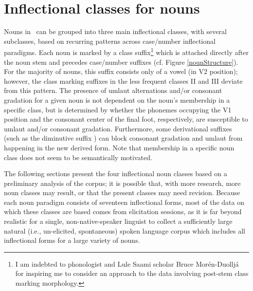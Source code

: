 

\section{Inflectional classes for nouns}\label{nounClasses}
Nouns in \PS\ can be grouped into three main inflectional classes, with several subclasses, based on recurring patterns across case/number inflectional paradigms. Each noun is marked by a class suffix\footnote{I am indebted to phonologist and Lule Saami scholar Bruce Morén-Duolljá for inspiring me to consider an approach to the data involving post-stem class marking morphology.} 
which is attached directly after the noun stem and precedes case/number suffixes (cf. Figure \vref{nounStructure}). For the majority of nouns, this suffix consists only of a vowel (in V2 position); however, the class marking suffixes in the less frequent classes II and III deviate from this pattern. 
The presence of umlaut alternations and/or consonant gradation for a given noun is not dependent on the noun’s membership in a specific class, but is determined by whether the phonemes occupying the V1 position and the consonant center of the final foot, respectively, are susceptible to umlaut and/or consonant gradation. Furthermore, some derivational suffixes (such as the diminutive suffix ) can block consonant gradation and umlaut from happening in the new derived form. 
Note that membership in a specific noun class does not seem to be semantically motivated. 

The following sections present the four inflectional noun classes based on a preliminary analysis of the corpus; it is possible that, with more research, more noun classes may result, or that the present classes may need revision. Because each noun paradigm consists of seventeen inflectional forms, most of the data on which these classes are based comes from elicitation sessions, as it is far beyond realistic for a single, non-native-speaker linguist to collect a sufficiently large natural (i.e., un-elicited, spontaneous) spoken language corpus which includes all inflectional forms for a large variety of nouns.

